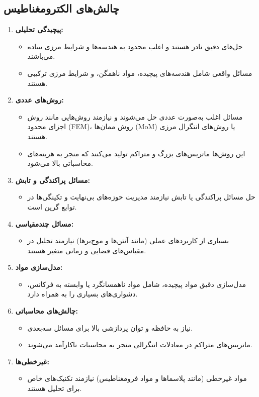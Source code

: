 \documentclass[12pt,a4paper]{article}
\begin{document}
\subsection{چالش‌های الکترومغناطیس}
\begin{enumerate}
    \item \textbf{پیچیدگی تحلیلی:}
          \begin{itemize}
              \item حل‌های دقیق نادر هستند و اغلب محدود به هندسه‌ها و شرایط مرزی ساده می‌باشند.
              \item مسائل واقعی شامل هندسه‌های پیچیده، مواد ناهمگن، و شرایط مرزی ترکیبی هستند.
          \end{itemize}
    \item \textbf{روش‌های عددی:}
          \begin{itemize}
              \item مسائل اغلب به‌صورت عددی حل می‌شوند و نیازمند روش‌هایی مانند روش اجزای محدود (FEM)، روش ممان‌ها (MoM) یا روش‌های انتگرال مرزی هستند.
              \item این روش‌ها ماتریس‌های بزرگ و متراکم تولید می‌کنند که منجر به هزینه‌های محاسباتی بالا می‌شود.
          \end{itemize}
    \item \textbf{مسائل پراکندگی و تابش:}
          \begin{itemize}
              \item حل مسائل پراکندگی یا تابش نیازمند مدیریت حوزه‌های بی‌نهایت و تکینگی‌ها در توابع گرین است.
          \end{itemize}
    \item \textbf{مسائل چندمقیاسی:}
          \begin{itemize}
              \item بسیاری از کاربردهای عملی (مانند آنتن‌ها و موج‌برها) نیازمند تحلیل در مقیاس‌های فضایی و زمانی متغیر هستند.
          \end{itemize}
    \item \textbf{مدل‌سازی مواد:}
          \begin{itemize}
              \item مدل‌سازی دقیق مواد پیچیده، شامل مواد ناهمسانگرد یا وابسته به فرکانس، دشواری‌های بسیاری را به همراه دارد.
          \end{itemize}
    \item \textbf{چالش‌های محاسباتی:}
          \begin{itemize}
              \item نیاز به حافظه و توان پردازشی بالا برای مسائل سه‌بعدی.
              \item ماتریس‌های متراکم در معادلات انتگرالی منجر به محاسبات ناکارآمد می‌شوند.
          \end{itemize}
    \item \textbf{غیرخطی‌ها:}
          \begin{itemize}
              \item مواد غیرخطی (مانند پلاسماها و مواد فرومغناطیس) نیازمند تکنیک‌های خاص برای تحلیل هستند.
          \end{itemize}
\end{enumerate}
\end{document}

